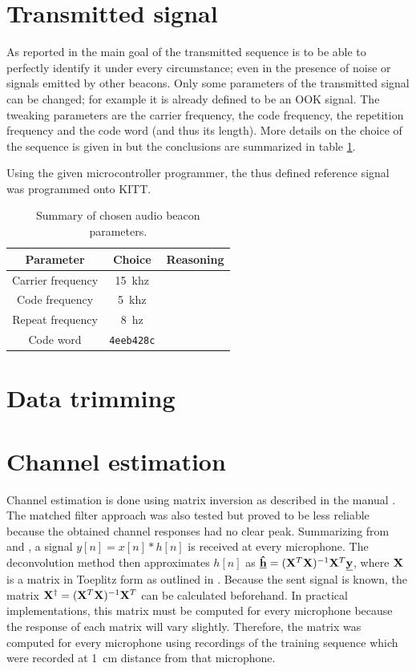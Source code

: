 \documentclass[11pt,titlepage]{report}
\begin{document}
\section{Transmitted signal}
\label{sec:loc_transmit}
As reported in \cite{epo4-del7} the main goal of the transmitted sequence is to be able to perfectly identify it under every circumstance; even in the presence of noise or signals emitted by other beacons. Only some parameters of the transmitted signal can be changed; for example it is already defined to be an OOK signal. The tweaking parameters are the carrier frequency, the code frequency, the repetition frequency and the code word (and thus its length). More details on the choice of the sequence is given in \cite{epo4-del7} but the conclusions are summarized in table \ref{tab:loc_signal}.

Using the given microcontroller programmer, the thus defined reference signal was programmed onto KITT.

\begin{table}[H]
\centering
\begin{tabular}{c | c | c}
\hline \hline
Parameter & Choice & Reasoning \\
\hline
Carrier frequency & \SI{15}{khz} & \\
Code frequency & \SI{5}{khz} & \\
Repeat frequency & \SI{8}{hz} & \\
Code word & \texttt{4eeb428c} & \\
\end{tabular}
\caption{Summary of chosen audio beacon parameters.}
\label{tab:loc_signal}
\end{table}

\section{Data trimming}
\label{sec:loc_data_trim}

\section{Channel estimation}
\label{sec:loc_est_h}
Channel estimation is done using matrix inversion as described in the manual \cite{epo4-manual}. The matched filter approach was also tested but proved to be less reliable because the obtained channel responses had no clear peak. Summarizing from \cite{epo4-manual} and \cite{epo4-del7}, a signal $y[n]=x[n]*h[n]$ is received at every microphone. The deconvolution method then approximates $h[n]$ as $\mathbf{\underline{\hat{h}}}=(\mathbf{X}^T\mathbf{X})^{-1}\mathbf{X}^T\mathbf{\underline{y}}$, where $\mathbf{X}$ is a matrix in Toeplitz form as outlined in \cite{epo4-manual}. Because the sent signal is known, the matrix $\mathbf{X}^\dagger=(\mathbf{X}^T\mathbf{X})^{-1}\mathbf{X}^T$ can be calculated beforehand. In practical implementations, this matrix must be computed for every microphone because the response of each matrix will vary slightly. Therefore, the matrix was computed for every microphone using recordings of the training sequence which were recorded at \SI{1}{cm} distance from that microphone.
\end{document}
